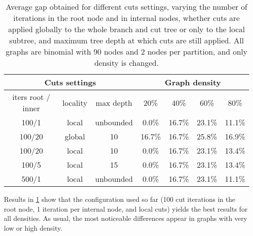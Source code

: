 \begin{table}[h]
\centering
\begin{tabular}{|ccc|c|c|c|c|}
\hline
\multicolumn{3}{|c|}{Cuts settings} & \multicolumn{4}{|c|}{Graph density} \\
\hline
iters root / inner & locality & max depth & 20\% & 40\% & 60\% & 80\%
\\
\hline
100/1 & local & unbounded & 0.0\% & 16.7\% & 23.1\% & 11.1\% \\ 
100/20 & global & 10& 16.7\% & 16.7\% & 25.8\% & 16.9\%  \\
100/20 & local & 10& 0.0\% & 16.7\% & 23.1\% & 13.4\%  \\
100/5 & local & 15& 0.0\% & 16.7\% & 23.1\% & 13.4\%  \\
500/1 & local & unbounded& 0.0\% & 16.7\% & 23.1\% & 11.1\%  \\
\hline
 \end{tabular}
\caption{Average gap obtained for different cuts settings, varying the number of iterations in the root node and in internal nodes, whether cuts are applied globally to the whole branch and cut tree or only to the local subtree, and maximum tree depth at which cuts are still applied. All graphs are binomial with 90 nodes and 2 nodes per partition, and only density is changed.}
\label{table:bnc:cutsiters}
\end{table}
 
Results in \ref{table:bnc:cutsiters} show that the configuration used so far (100 cut iterations in the root node, 1 iteration per internal node, and local cuts) yields the best results for all densities. As usual, the most noticeable differences appear in graphs with very low or high density.